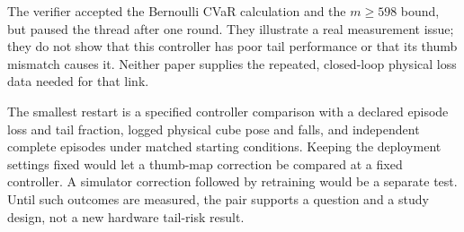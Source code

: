 \documentclass{article}
\begin{document}
The verifier accepted the Bernoulli CVaR calculation and the \(m\geq598\) bound, but paused the
thread after one round. They illustrate a real measurement issue; they do not show that this
controller has poor tail performance or that its thumb mismatch causes it. Neither paper supplies
the repeated, closed-loop physical loss data needed for that link.

The smallest restart is a specified controller comparison with a declared episode loss and tail
fraction, logged physical cube pose and falls, and independent complete episodes under matched
starting conditions. Keeping the deployment settings fixed would let a thumb-map correction be
compared at a fixed controller. A simulator correction followed by retraining would be a separate
test. Until such outcomes are measured, the pair supports a question and a study design, not a new
hardware tail-risk result.



\end{document}
